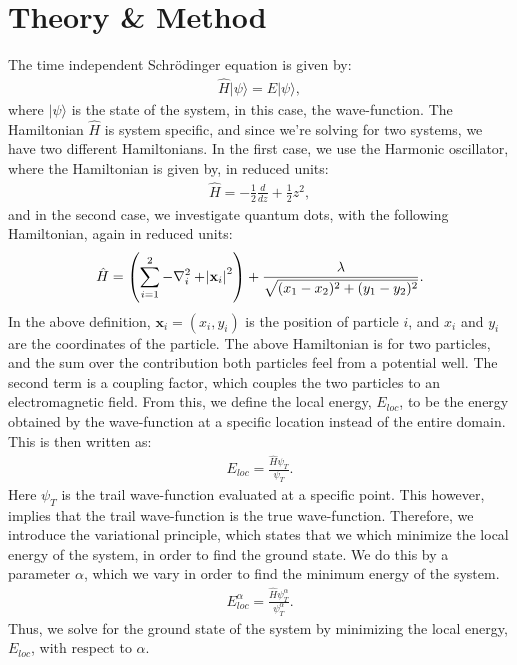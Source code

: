 \documentclass[a4paper]{article}
\newcommand{\laplace}{\nabla^2}
\newcommand{\ket}[1]{|#1\rangle}
\begin{document}
\section{Theory \& Method}
The time independent Schrödinger equation is given by:
\begin{align*}
    \hat{H}\ket{\psi} = E\ket{\psi},
\end{align*}where $\ket{\psi}$ is the state of the system, in this case, the wave-function.
The Hamiltonian $\hat{H}$ is system specific, and since we're solving for two systems, we have two different Hamiltonians.
In the first case, we use the Harmonic oscillator, where the Hamiltonian is given by, in reduced units:
\begin{align}
    \hat{H} = -\frac{1}{2}\frac{d}{dz} + \frac{1}{2}z^2,\label{eq: harmonic_oscillator Hamiltonian} 
\end{align}and in the second case, we investigate quantum dots, with the following Hamiltonian, again in reduced units:
\begin{align}
    \hat{H} = \left(\sum_{i = 1}^2 -\laplace_i + \abs{\mathbf{x}_i}^2\right) + \frac{\lambda}{\sqrt{(x_1 - x_2)^2 + (y_1 - y_2)^2}}.\label{eq: quantum dots Hamiltonian}
\end{align}In the above definition, $\mathbf{x}_i = (x_i, y_i)$ is the position of particle $i$, and $x_i$ and $y_i$ are the coordinates of the particle.
The above Hamiltonian is for two particles, and the sum over the contribution both particles feel from a potential well.
The second term is a coupling factor, which couples the two particles to an electromagnetic field.
From this, we define the local energy, $E_{loc}$, to be the energy obtained by the wave-function at a specific location instead of the entire domain. This is then written as:
\begin{align*}
    E_{loc} = \frac{\hat{H}\psi_T}{\psi_T}.
\end{align*}Here $\psi_T$ is the trail wave-function evaluated at a specific point.
This however, implies that the trail wave-function is the true wave-function.
Therefore, we introduce the variational principle, which states that we which minimize the local energy of the system, in order to find the ground state.
We do this by a parameter $\alpha$, which we vary in order to find the minimum energy of the system.
\begin{align}
    E_{loc}^\alpha = \frac{\hat{H}\psi_T^\alpha}{\psi_T^\alpha}. \label{eq: local energy minimize}
\end{align}Thus, we solve for the ground state of the system by minimizing the local energy, $E_{loc}$, with respect to $\alpha$.
\end{document}
